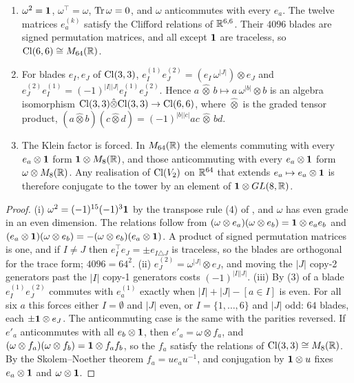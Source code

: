 \begin{proposition}
\label{d5:prop:graded}
\begin{enumerate}[label=(\roman*),leftmargin=2.2em]
\item $\omega^2=\mathbf 1$, $\omega^{\!\top}=\omega$, $\operatorname{Tr}\omega=0$, and $\omega$ anticommutes with every $e_a$. The twelve matrices $e^{(k)}_a$ satisfy
the Clifford relations of $\mathbb{R}^{6,6}$. Their $4096$ blades are signed permutation matrices, and all except $\mathbf 1$ are traceless, so
$\mathrm{Cl}(6,6)\cong M_{64}(\mathbb{R})$.
\item For blades $e_I,e_J$ of $\mathrm{Cl}(3,3)$, $e^{(1)}_Ie^{(2)}_J=(e_I\,\omega^{|J|})\otimes e_J$ and $e^{(2)}_Je^{(1)}_I=(-1)^{|I||J|}e^{(1)}_Ie^{(2)}_J$.
Hence $a\,\hat\otimes\,b\mapsto a\,\omega^{|b|}\otimes b$ is an algebra isomorphism $\mathrm{Cl}(3,3)\hat\otimes\mathrm{Cl}(3,3)\to\mathrm{Cl}(6,6)$, where $\hat\otimes$
is the graded tensor product, $(a\hat\otimes b)(c\hat\otimes d)=(-1)^{|b||c|}ac\,\hat\otimes\,bd$.
\item The Klein factor is forced. In $M_{64}(\mathbb{R})$ the elements commuting with every $e_a\otimes\mathbf 1$ form $\mathbf 1\otimes M_8(\mathbb{R})$, and those
anticommuting with every $e_a\otimes\mathbf 1$ form $\omega\otimes M_8(\mathbb{R})$. Any realisation of $\mathrm{Cl}(V_2)$ on $\mathbb{R}^{64}$ that extends
$e_a\mapsto e_a\otimes\mathbf 1$ is therefore conjugate to the tower by an element of $\mathbf 1\otimes GL(8,\mathbb{R})$.
\end{enumerate}
\end{proposition}

\begin{proof}
(i) $\omega^2=(-1)^{15}(-1)^3\mathbf 1$ by the transpose rule (4) of \cite{ES17}, and $\omega$ has even grade in an even dimension. The relations
follow from $(\omega\otimes e_a)(\omega\otimes e_b)=\mathbf 1\otimes e_ae_b$ and $(e_a\otimes\mathbf 1)(\omega\otimes e_b)=-(\omega\otimes e_b)(e_a\otimes\mathbf 1)$. A product
of signed permutation matrices is one, and if $I\neq J$ then $e_I^{\!\top}e_J=\pm e_{I\triangle J}$ is traceless, so the blades are orthogonal
for the trace form; $4096=64^2$. (ii) $e^{(2)}_J=\omega^{|J|}\otimes e_J$, and moving the $|J|$ copy-2 generators past the $|I|$ copy-1
generators costs $(-1)^{|I||J|}$. (iii) By (3) of \cite{ES17} a blade $e^{(1)}_Ie^{(2)}_J$ commutes with $e^{(1)}_a$ exactly when
$|I|+|J|-[a\in I]$ is even. For all six $a$ this forces either $I=\emptyset$ and $|J|$ even, or $I=\{1,\dots,6\}$ and $|J|$ odd: $64$ blades,
each $\pm\mathbf 1\otimes e_J$. The anticommuting case is the same with the parities reversed. If $e'_a$ anticommutes with all $e_b\otimes\mathbf 1$, then
$e'_a=\omega\otimes f_a$, and $(\omega\otimes f_a)(\omega\otimes f_b)=\mathbf 1\otimes f_af_b$, so the $f_a$ satisfy the relations of $\mathrm{Cl}(3,3)\cong M_8(\mathbb{R})$. By the
Skolem--Noether theorem $f_a=ue_au^{-1}$, and conjugation by $\mathbf 1\otimes u$ fixes $e_a\otimes\mathbf 1$ and $\omega\otimes\mathbf 1$.
\end{proof}

